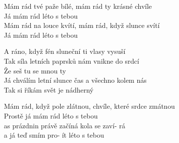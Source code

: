 \ve{}
Mám rád tvé paže bílé, mám rád ty krásné chvíle\\
Já mám rád léto s tebou\\
Mám rád na louce kvítí, mám rád, když slunce svítí\\
Já mám rád léto s tebou 

A ráno, když fén sluneční ti vlasy vysuší\\
Tak síla letních paprsků nám vnikne do srdcí\\
Že seš tu se mnou ty\\
Já chválím letní slunce čas a všechno kolem nás\\
Tak si říkám svět je nádherný 

\vspace{-5pt}
\ve{}
Mám rád, když pole zlátnou, chvíle, které srdce zmátnou\\
Prostě já mám rád léto s tebou\\
as prázdnin právě začíná \quad {}kola se zaví- \qquad {}rá\\
a já teď smím pro- \quad {}ít léto s tebou 

\esong{}